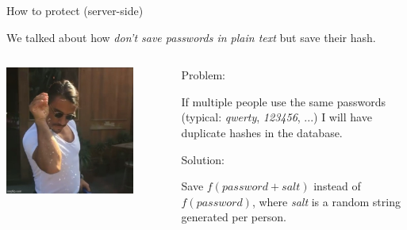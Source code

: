 \documentclass[handout, xcolor=dvipsnames,aspectratio=169]{beamer}
\begin{document}
\begin{frame}{How to protect (server-side)}
  
  We talked about how \textit{don't save passwords in plain text} but save their hash.


  \begin{columns}
    \begin{column}{0.4\textwidth}

      \begin{center}
        \includegraphics[width=0.8\textwidth]{img/salt.jpg}
        \end{center}

      \end{column}
    \begin{column}{0.6\textwidth}  %

        
  \pause

  Problem: 
  
  If multiple people use the same passwords (typical: \textit {qwerty}, \textit {123456}, ...) I will have duplicate hashes in the database.

  \medskip
  \pause
  Solution: 
  
  Save $f(password + salt)$ instead of $f(password)$, where \textit{salt} is a random string generated per person.
  

    \end{column}
    \end{columns}
  
\end{frame}
\end{document}
